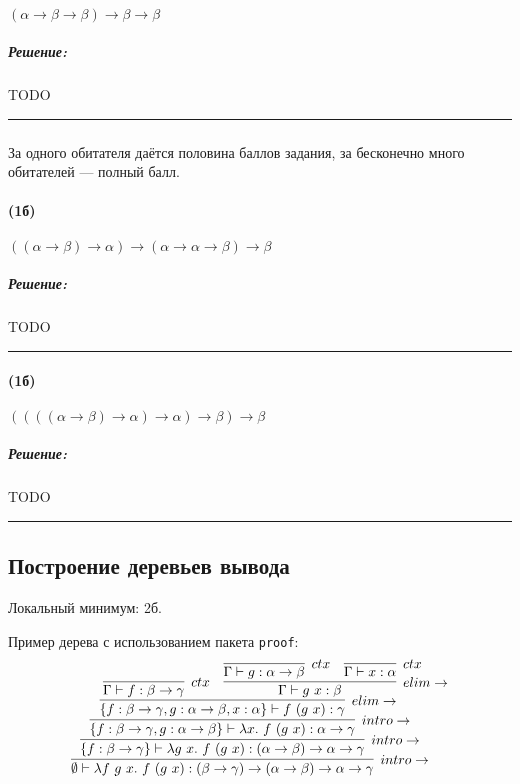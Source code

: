 \documentclass{article}
\newenvironment{proof}{\subparagraph{\hspace{-1em}Решение:\newline}}{\par\noindent\rule{\textwidth}{0.4pt}}
\begin{document}
    \paragraph{} $(\alpha \to \beta \to \beta) \to \beta \to \beta$

    \begin{proof}
        TODO %
    \end{proof}

    \subsubsection{}

    За одного обитателя даётся половина баллов задания, за бесконечно много обитателей --- полный балл.

    \paragraph{(1б)} $((\alpha \to \beta) \to \alpha) \to (\alpha \to \alpha \to \beta) \to \beta$

    \begin{proof}
        TODO %
    \end{proof}

    \paragraph{(1б)} $((((\alpha \to \beta) \to \alpha) \to \alpha) \to \beta) \to \beta$

    \begin{proof}
        TODO %
    \end{proof}

    \subsection{Построение деревьев вывода}

    Локальный минимум: 2б.

    Пример дерева с использованием пакета \texttt{proof}:
    \[\resizebox{0.8\hsize}{!}{
        \infer[intro\to]
        {\emptyset \vdash \lambda f~g~x.~f~(g~x) : (\beta \to \gamma) \to (\alpha \to \beta) \to \alpha \to \gamma}
        {
            \infer[intro\to]
            {\{f: \beta \to \gamma\} \vdash \lambda g~x.~f~(g~x) : (\alpha \to \beta) \to \alpha \to \gamma}
            {
                \infer[intro\to]
                {\{f : \beta \to \gamma, g : \alpha \to \beta\} \vdash \lambda x.~f~(g~x) : \alpha \to \gamma}
                {
                    \infer[elim\to]{\{f : \beta \to \gamma, g : \alpha \to \beta, x:  \alpha\} \vdash f~(g~x) : \gamma}
                    {
                        \infer[ctx]{\Gamma \vdash f : \beta \to \gamma}{} &
                        \infer[elim\to]{\Gamma \vdash g~x : \beta}{
                            \infer[ctx]{\Gamma \vdash g : \alpha \to \beta}{} &
                            \infer[ctx]{\Gamma \vdash x : \alpha}{}
                        }
                    }
                }
            }
        }
    }\]
\end{document}
